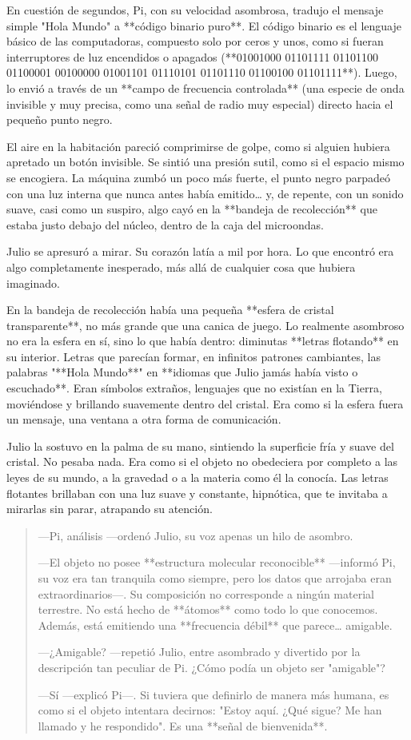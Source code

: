 \documentclass[a4paper,12pt]{book}
\begin{document}
En cuestión de segundos, Pi, con su velocidad asombrosa, tradujo el mensaje simple "Hola Mundo" a **código binario puro**. El código binario es el lenguaje básico de las computadoras, compuesto solo por ceros y unos, como si fueran interruptores de luz encendidos o apagados (**01001000 01101111 01101100 01100001 00100000 01001101 01110101 01101110 01100100 01101111**). Luego, lo envió a través de un **campo de frecuencia controlada** (una especie de onda invisible y muy precisa, como una señal de radio muy especial) directo hacia el pequeño punto negro.

El aire en la habitación pareció comprimirse de golpe, como si alguien hubiera apretado un botón invisible. Se sintió una presión sutil, como si el espacio mismo se encogiera. La máquina zumbó un poco más fuerte, el punto negro parpadeó con una luz interna que nunca antes había emitido… y, de repente, con un sonido suave, casi como un suspiro, algo cayó en la **bandeja de recolección** que estaba justo debajo del núcleo, dentro de la caja del microondas.

Julio se apresuró a mirar. Su corazón latía a mil por hora. Lo que encontró era algo completamente inesperado, más allá de cualquier cosa que hubiera imaginado.

En la bandeja de recolección había una pequeña **esfera de cristal transparente**, no más grande que una canica de juego. Lo realmente asombroso no era la esfera en sí, sino lo que había dentro: diminutas **letras flotando** en su interior. Letras que parecían formar, en infinitos patrones cambiantes, las palabras "**Hola Mundo**" en **idiomas que Julio jamás había visto o escuchado**. Eran símbolos extraños, lenguajes que no existían en la Tierra, moviéndose y brillando suavemente dentro del cristal. Era como si la esfera fuera un mensaje, una ventana a otra forma de comunicación.

Julio la sostuvo en la palma de su mano, sintiendo la superficie fría y suave del cristal. No pesaba nada. Era como si el objeto no obedeciera por completo a las leyes de su mundo, a la gravedad o a la materia como él la conocía. Las letras flotantes brillaban con una luz suave y constante, hipnótica, que te invitaba a mirarlas sin parar, atrapando su atención.

\begin{quote}
    —Pi, análisis —ordenó Julio, su voz apenas un hilo de asombro.

    —El objeto no posee **estructura molecular reconocible** —informó Pi, su voz era tan tranquila como siempre, pero los datos que arrojaba eran extraordinarios—. Su composición no corresponde a ningún material terrestre. No está hecho de **átomos** como todo lo que conocemos. Además, está emitiendo una **frecuencia débil** que parece… amigable.

    —¿Amigable? —repetió Julio, entre asombrado y divertido por la descripción tan peculiar de Pi. ¿Cómo podía un objeto ser "amigable"?

    —Sí —explicó Pi—. Si tuviera que definirlo de manera más humana, es como si el objeto intentara decirnos: "Estoy aquí. ¿Qué sigue? Me han llamado y he respondido". Es una **señal de bienvenida**.
\end{quote}
\end{document}
